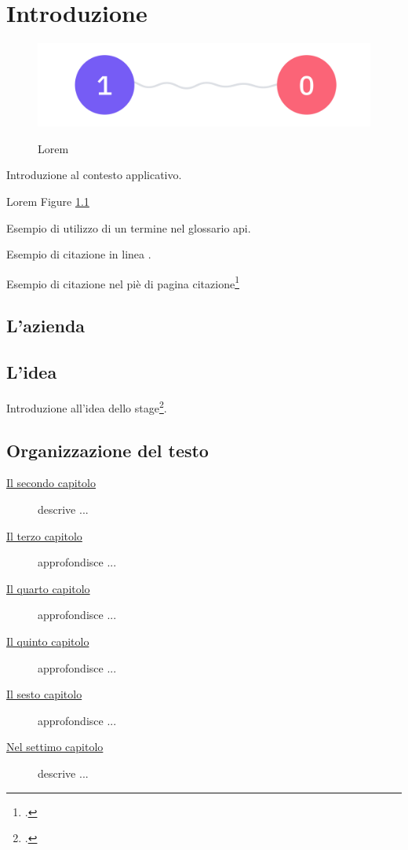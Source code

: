 \chapter{Introduzione}
\label{chap:introduzione}

\begin{figure}[H]
    \centering
    \includegraphics[alt={Testo alternativo dell'immagine}, width=1\columnwidth]{img/quantum_entanglement.jpeg}
    \caption{Lorem}
    \label{fig:entanglement}
\end{figure}

Introduzione al contesto applicativo.

Lorem Figure \ref{fig:entanglement}

Esempio di utilizzo di un termine nel glossario \gls{api}.

Esempio di citazione in linea \cite{site:agile-manifesto}.

Esempio di citazione nel piè di pagina citazione\footcite{womak:lean-thinking}

\lipsum[1-2]

\section{L'azienda}
\lipsum[1]

\section{L'idea}
Introduzione all'idea dello stage\footcite{article:spooky}.
\lipsum[1-3]

\section{Organizzazione del testo}
\begin{description}
    \item[{\hyperref[chap:processi-metodologie]{Il secondo capitolo}}] descrive ...
    
    \item[{\hyperref[chap:descrizione-stage]{Il terzo capitolo}}] approfondisce ...
    
    \item[{\hyperref[chap:analisi-requisiti]{Il quarto capitolo}}] approfondisce ...
    
    \item[{\hyperref[chap:progettazione-codifica]{Il quinto capitolo}}] approfondisce ...
    
    \item[{\hyperref[chap:verifica-validazione]{Il sesto capitolo}}] approfondisce ...
    
    \item[{\hyperref[chap:conclusioni]{Nel settimo capitolo}}] descrive ...
\end{description}

